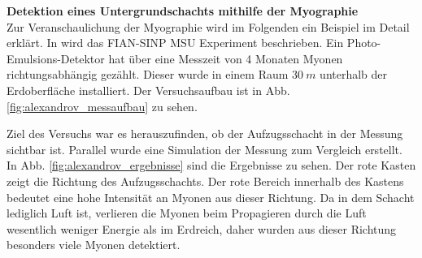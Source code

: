 


\textbf{Detektion eines Untergrundschachts mithilfe der Myographie} \\
Zur Veranschaulichung der Myographie wird im Folgenden ein Beispiel im Detail erklärt.
In \cite{Alexandrov2017} wird das  FIAN-SINP MSU Experiment beschrieben.
Ein Photo-Emulsions-Detektor hat über eine Messzeit von 4 Monaten   
Myonen richtungsabhängig gezählt.
Dieser wurde in einem Raum $\SI[]{30}[]{m}$ unterhalb der Erdoberfläche 
installiert. 
Der Versuchsaufbau ist in Abb. \ref{fig:alexandrov_messaufbau} zu sehen.

Ziel des Versuchs war es herauszufinden, ob der Aufzugsschacht in der Messung sichtbar ist. 
Parallel wurde eine Simulation der Messung zum Vergleich erstellt.
In Abb. \ref{fig:alexandrov_ergebnisse} sind die Ergebnisse zu sehen.
Der rote Kasten zeigt die Richtung des Aufzugsschachts.
Der rote Bereich innerhalb des Kastens bedeutet eine hohe Intensität an Myonen aus dieser Richtung.
Da in dem Schacht lediglich Luft ist, verlieren die Myonen beim Propagieren
durch die Luft wesentlich weniger Energie als im Erdreich, daher wurden aus dieser Richtung besonders viele Myonen detektiert.

